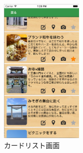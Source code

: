 \begin{figure}[htbp]
 \begin{center}
\includegraphics[width=4cm, bb=0 0 303 573]{cardList.png}
 \end{center}
\addtocounter{figure}{+0}
 \caption{カードリスト画面}
 \label{fig:one}
\end{figure}

